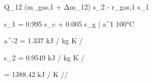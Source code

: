 Q_12 (m_gas,1 + Δm_12) s_2 - r_gas,1 s_1

s_1 = 0.995 s_c + 0.005 s_g | a^1 100°C

a^-2 = 1.337 kJ / kg K /

s_2 = 0.9549 kJ / kg K /

= 1388.42 kJ / K //